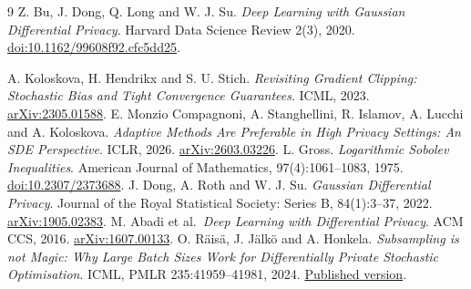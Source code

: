 \documentclass[11pt]{article}
\begin{document}
\begin{thebibliography}{9}
Z. Bu, J. Dong, Q. Long and W. J. Su.
\emph{Deep Learning with Gaussian Differential Privacy}.
Harvard Data Science Review 2(3), 2020.
\href{https://doi.org/10.1162/99608f92.cfc5dd25}{doi:10.1162/99608f92.cfc5dd25}.

A. Koloskova, H. Hendrikx and S. U. Stich.
\emph{Revisiting Gradient Clipping: Stochastic Bias and Tight Convergence
Guarantees}. ICML, 2023. \href{https://arxiv.org/abs/2305.01588}{arXiv:2305.01588}.
E. Monzio Compagnoni, A. Stanghellini, R. Islamov, A. Lucchi and A. Koloskova.
\emph{Adaptive Methods Are Preferable in High Privacy Settings:
An SDE Perspective}. ICLR, 2026.
\href{https://arxiv.org/abs/2603.03226}{arXiv:2603.03226}.
L. Gross. \emph{Logarithmic Sobolev Inequalities}.
American Journal of Mathematics, 97(4):1061--1083, 1975.
\href{https://doi.org/10.2307/2373688}{doi:10.2307/2373688}.
J. Dong, A. Roth and W. J. Su.
\emph{Gaussian Differential Privacy}. Journal of the Royal Statistical
Society: Series B, 84(1):3--37, 2022.
\href{https://arxiv.org/abs/1905.02383}{arXiv:1905.02383}.
M. Abadi et al.\ \emph{Deep Learning with Differential Privacy}.
ACM CCS, 2016. \href{https://arxiv.org/abs/1607.00133}{arXiv:1607.00133}.
O. R\"ais\"a, J. J\"alk\"o and A. Honkela.
\emph{Subsampling is not Magic: Why Large Batch Sizes Work for Differentially
Private Stochastic Optimisation}. ICML, PMLR 235:41959--41981, 2024.
\href{https://proceedings.mlr.press/v235/raisa24a.html}{Published version}.
\end{thebibliography}
\end{document}
